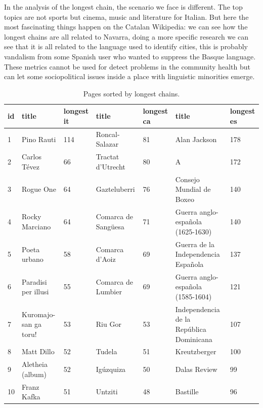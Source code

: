 In the analysis of the longest chain, the scenario we face is different. The top topics are not
sports but cinema, music and literature for Italian. But here the most fascinating things happen on
the Catalan Wikipedia: we can see how the longest chains are all related to Navarra, doing a more
specific research we can see that it is all related to the language used to identify cities, this is
probably vandalism from some Spanish user who wanted to suppress the Basque language. These metrics
cannot be used for detect problems in the community health but can let some sociopolitical
issues inside a place with linguistic minorities emerge.
\begin{table}[H]
    \centering
    \begin{tabularx}{\columnwidth}{@{}Xllllll@{}}
        \midrule
        \textbf{id} & \textbf{title} & \textbf{longest it}& \textbf{title} & \textbf{longest ca} & \textbf{title} & \textbf{longest es} \\ \toprule
        1 & Pino Rauti  & 114  & Roncal-Salazar & 81 & Alan  Jackson & 178\\
        2 & Carlos Tévez & 66  & Tractat  d'Utrecht & 80 & A & 172\\
        3 & Rogue  One & 64  & Gazteluberri & 76 & Consejo  Mundial  de  Boxeo & 140\\
        4 & Rocky  Marciano & 64  &Comarca  de  Sangüesa& 71 & Guerra  anglo-española  (1625-1630) & 140\\
        5 & Poeta  urbano & 58  &Comarca  d'Aoiz & 69 & Guerra  de  la  Independencia  Española& 137\\
        6 & Paradisi  per  illusi & 55  & Comarca  de  Lumbier& 69 & Guerra  anglo-española  (1585-1604) & 121\\
        7 & Kuromajo-san  ga  toru!  & 53  &Riu  Gor & 53 & Independencia  de  la  República  Dominicana & 107\\
        8 & Matt  Dillo & 52 & Tudela & 51 & Kreutzberger & 100\\
        9 & Aletheia  (album) & 52 & Igúzquiza& 50 & Dalas  Review & 99\\
        10 & Franz  Kafka & 51  &Untziti & 48 & Bastille & 96\\


         \bottomrule
    \end{tabularx}
    
    \caption{Pages sorted by longest chains. \label{table:longestchain}}
\end{table}


